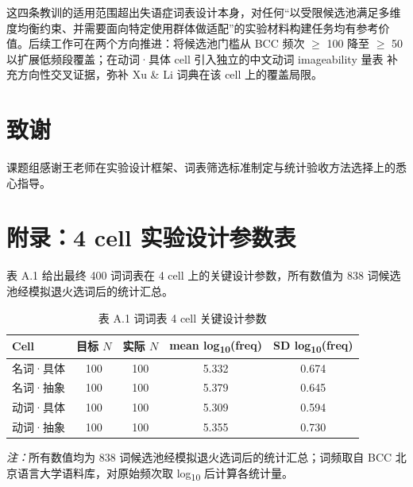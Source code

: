 \documentclass[12pt, a4paper]{article}
\begin{document}
这四条教训的适用范围超出失语症词表设计本身，对任何“以受限候选池满足多维度均衡约束、并需要面向特定使用群体做适配”的实验材料构建任务均有参考价值。后续工作可在两个方向推进：将候选池门槛从 BCC 频次 $\geq$ 100 降至 $\geq$ 50 以扩展低频段覆盖；在动词·具体 cell 引入独立的中文动词 imageability 量表 \cite{wang2019imageability} 补充方向性交叉证据，弥补 Xu \& Li 词典在该 cell 上的覆盖局限。

\section*{致谢}

课题组感谢王老师在实验设计框架、词表筛选标准制定与统计验收方法选择上的悉心指导。

\printbibliography[title={参考文献}, heading=bibnumbered]

\appendix
\section{附录：4 cell 实验设计参数表}

表 A.1 给出最终 400 词词表在 4 cell 上的关键设计参数，所有数值为 838 词候选池经模拟退火选词后的统计汇总。

\begin{table}[h]
\centering
\caption{表 A.1  词词表 4 cell 关键设计参数}
\begin{tabular}{lcccc}
\toprule
Cell & 目标 $N$ & 实际 $N$ & mean log\textsubscript{10}(freq) & SD log\textsubscript{10}(freq) \\
\midrule
名词·具体 & 100 & 100 & 5.332 & 0.674 \\
名词·抽象 & 100 & 100 & 5.379 & 0.645 \\
动词·具体 & 100 & 100 & 5.309 & 0.594 \\
动词·抽象 & 100 & 100 & 5.355 & 0.730 \\
\bottomrule
\end{tabular}
\end{table}

\noindent\textit{注：}所有数值均为 838 词候选池经模拟退火选词后的统计汇总；词频取自 BCC 北京语言大学语料库，对原始频次取 log\textsubscript{10} 后计算各统计量。
\end{document}
